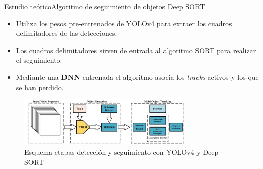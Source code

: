 
\begin{frame}{Estudio teórico}{Algoritmo de seguimiento de objetos Deep SORT}

\begin{itemize}
    \justifying
    \item Utiliza los pesos pre-entrenados de YOLOv4 para extraer los cuadros delimitadores de las detecciones.
    \item Los cuadros delimitadores sirven de entrada al algoritmo SORT para realizar el seguimiento. %
    \item Mediante una \textbf{DNN} entrenada el algoritmo asocia los \textit{tracks} activos y los que se han perdido.
\end{itemize}

\begin{figure}[ht]
\centering
\includegraphics[width=0.75\textwidth]{Images/estudio-teorico/yolo-deepsort-scheme.jpg}
\caption{\label{fig:yolo-deepsort-scheme}Esquema etapas detección y seguimiento con YOLOv4 y Deep SORT}
\end{figure}

\end{frame}
